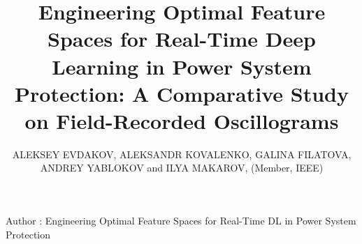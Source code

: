 \documentclass{ieeeojies}
\begin{document}
\title{Engineering Optimal Feature Spaces for Real-Time Deep Learning in Power System Protection: A Comparative Study on Field-Recorded Oscillograms}
\author{\uppercase{Aleksey Evdakov},
\uppercase{Aleksandr Kovalenko},
\uppercase{Galina Filatova},
\uppercase{Andrey Yablokov}
and \uppercase{Ilya Makarov}, (Member, IEEE)}


\address[1]{LLC "APS", Moscow, Russia}
\address[2]{ISPEU, Ivanovo, Russia}
\address[3]{Artificial Intelligence Research Center, National Research Nuclear University MEPhI, Moscow, Russia}
\address[4]{AIRI, Moscow, Russia}





{Author \headeretal: Engineering Optimal Feature Spaces for Real-Time DL in Power System Protection}
\end{document}
